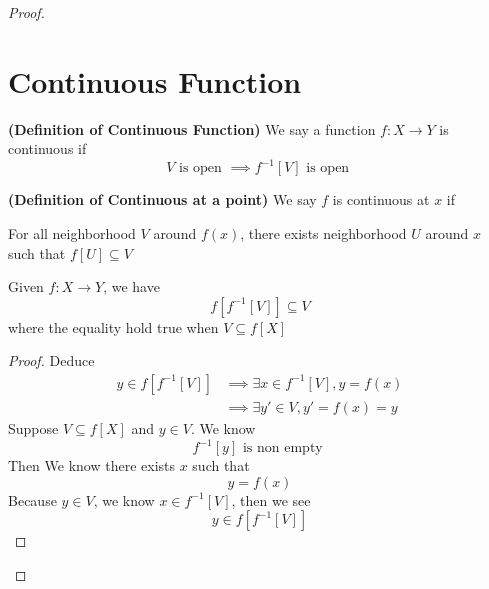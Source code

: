 \documentclass{report}
\begin{document}
\begin{proof}
\section{Continuous Function} 
\begin{definition}
\label{2.4.1}
\textbf{(Definition of Continuous Function)} We say a function $f:X\rightarrow Y$ is continuous if  
\begin{equation*}
V\text{ is open }\implies f^{-1}\left[V \right]\text{ is open }
\end{equation*}
\end{definition}
\begin{definition}
\label{2.4.2}
\textbf{(Definition of Continuous at a point)} We say $f$ is continuous at $x$ if 
\begin{center}
   \begin{minipage}{0.9\linewidth}  
       For all neighborhood $V$ around $f\left(x \right)$, there exists neighborhood $U$ around $x$ such that $f\left[U \right]\subseteq V$
   \end{minipage}
\end{center}
\end{definition}
\begin{lemma}
\label{2.4.3}
Given $f:X\rightarrow Y$, we have
\begin{equation*}
f\left[f^{-1}\left[V \right] \right]\subseteq V
\end{equation*}
where the equality hold true when $V\subseteq f\left[X \right]$
\end{lemma}
\begin{proof}
Deduce 
\begin{align*}
  y\in f\left[f^{-1}\left[V \right] \right]&\implies \exists x\in f^{-1}\left[V \right], y=f\left(x \right)\\
&\implies \exists y'\in V, y'=f\left(x \right)=y
\end{align*}
Suppose $V\subseteq f\left[X \right]$ and $y\in V$. We know 
\begin{equation*}
f^{-1}\left[y \right]\text{ is non empty }
\end{equation*}
Then We know there exists $x$ such that 
 \begin{equation*}
y=f\left(x \right)
\end{equation*}
Because $y\in V$, we know $x\in f^{-1}\left[V \right]$, then we see 
\begin{equation*}
y\in f\left[f^{-1}\left[V \right] \right]
\end{equation*}
\end{proof}

\end{proof}
\end{document}
